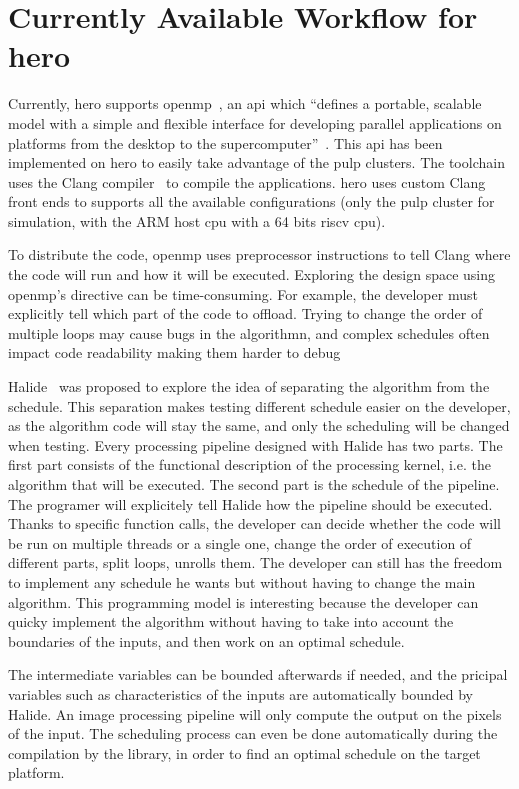 \section {Currently Available Workflow for \gls{hero}}
    Currently, \gls{hero} supports \gls{openmp}~\cite{Report:SoftwareStack}, an \gls{api} which ``defines a portable, scalable model with a simple and flexible interface for developing parallel applications on platforms from the desktop to the supercomputer''~\cite{Web:OpenMp}. This \gls{api} has been implemented on \gls{hero} to easily take advantage of the \gls{pulp} clusters. The toolchain uses the Clang compiler~\cite{Web:Wikipedia_OpenMP} to compile the applications. \gls{hero} uses custom Clang front ends to supports all the available configurations (only the \gls{pulp} cluster for simulation, with the ARM host \gls{cpu}  with a 64 bits \gls{riscv} \gls{cpu}).

    To distribute the code, \gls{openmp} uses preprocessor instructions to tell Clang where the code will run and how it will be executed. Exploring the design space using \gls{openmp}'s directive can be time-consuming. For example, the developer must explicitly tell which part of the code to offload. Trying to change the order of multiple loops may cause bugs in the algorithmn, and complex schedules often impact code readability making them harder to debug

    Halide~\cite{Art:Halide} was proposed to explore the idea of separating the algorithm from the schedule.
    This separation makes testing different schedule easier on the developer, as the algorithm code will stay the same, and only the scheduling will be changed when testing.
    Every processing pipeline designed with Halide has two parts. The first part consists of the functional description of the processing kernel, i.e. the algorithm that will be executed. 
	The second part is the schedule of the pipeline. The programer will explicitely tell Halide how the pipeline should be executed. Thanks to specific function calls, the developer can decide whether the code will be run on multiple threads or a single one, change the order of execution of different parts, split loops, unrolls them. The developer can still has the freedom to implement any schedule he wants but without having to change the main algorithm.
    This programming model is interesting because the developer can quicky implement the algorithm without having to take into account the boundaries of the inputs, and then work on an optimal schedule.

    The intermediate variables can be bounded afterwards if needed, and the pricipal variables such as characteristics of the inputs are automatically bounded by Halide. An image processing pipeline will only compute the output on the pixels of the input.
    The scheduling process can even be done automatically during the compilation by the library, in order to find an optimal schedule on the target platform.

